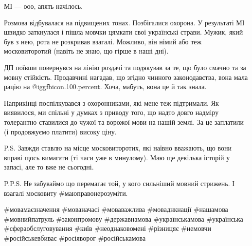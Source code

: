 МІ — ооо, апять начілось.

Розмова відбувалася на підвищених тонах. Позбігалися охорона. У результаті МІ
швидко заткнулася і пішла мовчки цямкати свої українські страви. Мужик, який
був з нею, рота не розкривав взагалі. Можливо, він німий або теж московиторотий
(навіть не знаю, що гірше в наші дні).

ДП поївши повернувся на лінію роздачі та подякував за те, що було смачно та за
мовну стійкість. Продавчині нагадав, що згідно чинного законодавства, вона мала
рацію на  @igg{fbicon.100.percent}. Хоча, мабуть, вона це й так знала. 


Наприкінці поспілкувався з охоронниками, які мене теж підтримали. Як виявилося,
ми спільні у думках з приводу того, що надто довго надміру толерантно ставилися
до чужої та ворожої мови на нашій землі. За це заплатили (і продовжуємо
платити) високу ціну.

P.S. Завжди ставлю на місце московиторотих, які наївно вважають, що вони вправі
щось вимагати (ті часи уже в минулому). Маю ще декілька історій у запасі, але
то вже не сьогодні.

P.P.S. Не забуваймо що перемагає той, у кого сильніший мовний стрижень. І
взагалі московиту \#маюправонерозуміти.

\#мовамаєзначення \#мованачасі \#моваважлива \#моваднкнації \#нашамова
\#мовнийпатруль \#законпромову \#державнамова \#українськамова \#українська
\#сфераобслуговування \#київ \#неоднаковомені \#різницяє \#немовчи \#російськевбиває
\#росіяворог \#російськамова

